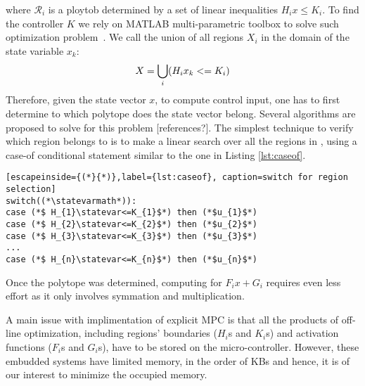 where $\mathcal{R}_i$ is a ploytob determined by  a set of linear inequalities $H_ix\leq K_i$. To find the controller $K$ we rely on MATLAB multi-parametric toolbox to solve such optimization problem~\cite{matlabMPT, matlabYALMIP}. We call \statespace\space the union of all regions $X_{i}$ in the domain of the state variable $x_{k}$:
\begin{equation}
X = \bigcup_{i}(H_{i}x_{k}<=K_{i})
\end{equation}
Therefore, given the state vector $x$, to compute control input, one has to first determine to which polytope does the state vector belong. Several algorithms are proposed to solve for this problem [references?]. The simplest technique to verify which region \statevarmath belongs to is to make a linear search over all the regions in \statespace\space, using a case-of conditional statement similar to the one in Listing \ref{lst:caseof}.

\begin{lstlisting}[escapeinside={(*}{*)},label={lst:caseof}, caption=switch for region selection]
switch((*\statevarmath*)):
case (*$ H_{1}\statevar<=K_{1}$*) then (*$u_{1}$*)
case (*$ H_{2}\statevar<=K_{2}$*) then (*$u_{2}$*)
case (*$ H_{3}\statevar<=K_{3}$*) then (*$u_{3}$*)
...
case (*$ H_{n}\statevar<=K_{n}$*) then (*$u_{n}$*)
\end{lstlisting}
Once the polytope was determined, computing for $F_ix+G_i$ requires even less effort as it only involves symmation and multiplication.  

A main issue with implimentation of explicit MPC is that all the products of off-line optimization, including regions' boundaries ($H_i$s and $K_i$s) and activation functions ($F_i$s and $G_i$s), have to be stored on the micro-controller. However, these embudded systems have limited memory, in the order of KBs and hence, it is of our interest to minimize the occupied memory.